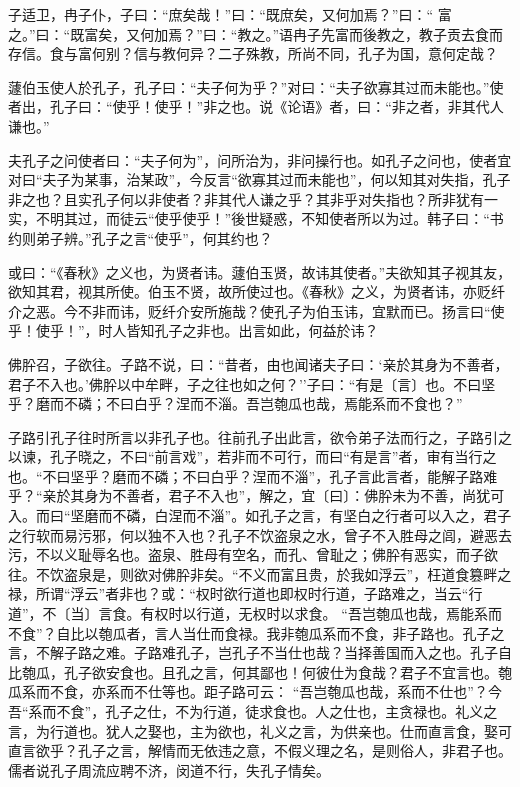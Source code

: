 \documentclass[]{article}
\begin{document}
子适卫，冉子仆，子曰：``庶矣哉！''曰：``既庶矣，又何加焉？''曰：``
富之。''曰：``既富矣，又何加焉？''曰：``教之。''语冉子先富而後教之，教子贡去食而存信。食与富何别？信与教何异？二子殊教，所尚不同，孔子为国，意何定哉？

蘧伯玉使人於孔子，孔子曰：``夫子何为乎？''对曰：``夫子欲寡其过而未能也。''使者出，孔子曰：``使乎！使乎！''非之也。说《论语》者，曰：``非之者，非其代人谦也。''

夫孔子之问使者曰：``夫子何为''，问所治为，非问操行也。如孔子之问也，使者宜对曰``夫子为某事，治某政''，今反言``欲寡其过而未能也''，何以知其对失指，孔子非之也？且实孔子何以非使者？非其代人谦之乎？其非乎对失指也？所非犹有一实，不明其过，而徒云``使乎使乎！''後世疑惑，不知使者所以为过。韩子曰：``书约则弟子辨。''孔子之言``使乎''，何其约也？

或曰：``《春秋》之义也，为贤者讳。蘧伯玉贤，故讳其使者。''夫欲知其子视其友，欲知其君，视其所使。伯玉不贤，故所使过也。《春秋》之义，为贤者讳，亦贬纤介之恶。今不非而讳，贬纤介安所施哉？使孔子为伯玉讳，宜默而已。扬言曰``使乎！使乎！''，时人皆知孔子之非也。出言如此，何益於讳？

佛肸召，子欲往。子路不说，曰：``昔者，由也闻诸夫子曰：`亲於其身为不善者，君子不入也。'佛肸以中牟畔，子之往也如之何？''子曰：``有是〔言〕也。不曰坚乎？磨而不磷；不曰白乎？涅而不淄。吾岂匏瓜也哉，焉能系而不食也？''

子路引孔子往时所言以非孔子也。往前孔子出此言，欲令弟子法而行之，子路引之以谏，孔子晓之，不曰``前言戏''，若非而不可行，而曰``有是言''者，审有当行之也。``不曰坚乎？磨而不磷；不曰白乎？涅而不淄''，孔子言此言者，能解子路难乎？``亲於其身为不善者，君子不入也''，解之，宜〔曰〕：佛肸未为不善，尚犹可入。而曰``坚磨而不磷，白涅而不淄''。如孔子之言，有坚白之行者可以入之，君子之行软而易污邪，何以独不入也？孔子不饮盗泉之水，曾子不入胜母之闾，避恶去污，不以义耻辱名也。盗泉、胜母有空名，而孔、曾耻之；佛肸有恶实，而子欲往。不饮盗泉是，则欲对佛肸非矣。``不义而富且贵，於我如浮云''，枉道食篡畔之禄，所谓``浮云''者非也？或：``权时欲行道也即权时行道，子路难之，当云``行道''，不〔当〕言食。有权时以行道，无权时以求食。
``吾岂匏瓜也哉，焉能系而不食''？自比以匏瓜者，言人当仕而食禄。我非匏瓜系而不食，非子路也。孔子之言，不解子路之难。子路难孔子，岂孔子不当仕也哉？当择善国而入之也。孔子自比匏瓜，孔子欲安食也。且孔之言，何其鄙也！何彼仕为食哉？君子不宜言也。匏瓜系而不食，亦系而不仕等也。距子路可云：
``吾岂匏瓜也哉，系而不仕也''？今吾``系而不食''，孔子之仕，不为行道，徒求食也。人之仕也，主贪禄也。礼义之言，为行道也。犹人之娶也，主为欲也，礼义之言，为供亲也。仕而直言食，娶可直言欲乎？孔子之言，解情而无依违之意，不假义理之名，是则俗人，非君子也。儒者说孔子周流应聘不济，闵道不行，失孔子情矣。
\end{document}
